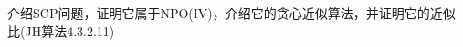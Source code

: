 \documentclass[a4paper, justified]{tufte-handout}
\begin{document}

\begin{ot}[SCP]	
	介绍SCP问题，证明它属于NPO(IV)，介绍它的贪心近似算法，并证明它的近似比(JH算法4.3.2.11)
\end{ot}




% 




\beginfb

% 
% 
\end{document}
